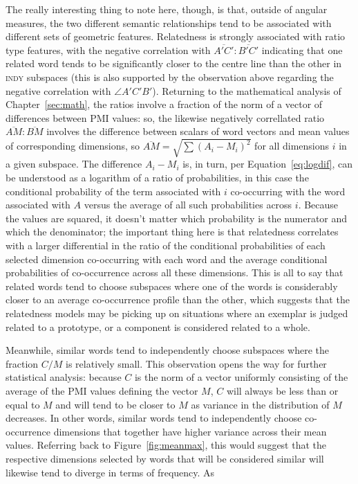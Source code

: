 The really interesting thing to note here, though, is that, outside of angular measures, the two different semantic relationships tend to be associated with different sets of geometric features.  Relatedness is strongly associated with ratio type features, with the negative correlation with $\overline{A'C'}:\overline{B'C'}$ indicating that one related word tends to be significantly closer to the centre line than the other in \textsc{indy} subspaces (this is also supported by the observation above regarding the negative correlation with $\angle A'C'B'$).  Returning to the mathematical analysis of Chapter~\ref{sec:math}, the ratios involve a fraction of the norm of a vector of differences between PMI values: so, the likewise negatively correllated ratio $\overline{AM}:\overline{BM}$ involves the difference between scalars of word vectors and mean values of corresponding dimensions, so $\overline{AM} = \sqrt{\sum(A_{i}-M_{i})^2}$ for all dimensions $i$ in a given subspace.  The difference $A_{i}-M_{i}$ is, in turn, per Equation~\ref{eq:logdif}, can be understood as a logarithm of a ratio of probabilities, in this case the conditional probability of the term associated with $i$ co-occurring with the word associated with $A$ versus the average of all such probabilities across $i$.  Because the values are squared, it doesn't matter which probability is the numerator and which the denominator; the important thing here is that relatedness correlates with a larger differential in the ratio of the conditional probabilities of each selected dimension co-occurring with each word and the average conditional probabilities of co-occurrence across all these dimensions.  This is all to say that related words tend to choose subspaces where one of the words is considerably closer to an average co-occurrence profile than the other, which suggests that the relatedness models may be picking up on situations where an exemplar is judged related to a prototype, or a component is considered related to a whole.

Meanwhile, similar words tend to independently choose subspaces where the fraction $C/M$ is relatively small.  This observation opens the way for further statistical analysis: because $C$ is the norm of a vector uniformly consisting of the average of the PMI values defining the vector $M$, $C$ will always be less than or equal to $M$ and will tend to be closer to $M$ as variance in the distribution of $M$ decreases.  In other words, similar words tend to independently choose co-occurrence dimensions that together have higher variance across their mean values.  Referring back to Figure~\ref{fig:meanmax}, this would suggest that the respective dimensions selected by words that will be considered similar will likewise tend to diverge in terms of frequency.  As

